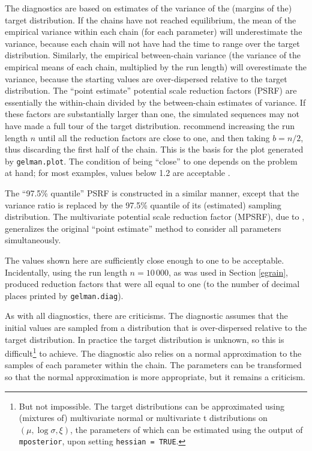\documentclass[11pt,a4paper]{article}
\begin{document}
The diagnostics are based on estimates of the variance of the (margins
of the) target distribution.  If the chains have not reached
equilibrium, the mean of the empirical variance within each chain (for
each parameter) will underestimate the variance, because each chain
will not have had the time to range over the target distribution.
Similarly, the empirical between-chain variance (the variance of the
empirical means of each chain, multiplied by the run length) will
overestimate the variance, because the starting values are
over-dispersed relative to the target distribution.  The ``point
estimate'' potential scale reduction factors (PSRF) are essentially
the within-chain divided by the between-chain estimates of variance.
If these factors are substantially larger than one, the simulated
sequences may not have made a full tour of the target distribution.
\citet{gelmrubi92} recommend increasing the run length $n$ until all
the reduction factors are close to one, and then taking $b=n/2$, thus
discarding the first half of the chain.  This is the basis for the
plot generated by \verb+gelman.plot+.  The condition of being
``close'' to one depends on the problem at hand; for most examples,
values below 1.2 are acceptable \citep{gelmcarl95}.

The ``97.5\% quantile'' PSRF is constructed in a similar manner,
except that the variance ratio is replaced by the 97.5\% quantile of
its (estimated) sampling distribution.  The multivariate potential
scale reduction factor (MPSRF), due to \citet{broogelm97}, generalizes
the original ``point estimate'' method to consider all parameters
simultaneously.

The values shown here are sufficiently close enough to one to be
acceptable.  Incidentally, using the run length $n=10\,000$, as was
used in Section \ref{egrain}, produced reduction factors that were all
equal to one (to the number of decimal places printed by
\verb+gelman.diag+).

As with all diagnostics, there are criticisms.  The diagnostic assumes
that the initial values are sampled from a distribution that is
over-dispersed relative to the target distribution.  In practice the
target distribution is unknown, so this is difficult\footnote{But not
  impossible. The target distributions can be approximated using
  (mixtures of) multivariate normal or multivariate t distributions on
  $(\mu, \log\sigma, \xi)$, the parameters of which can be estimated
  using the output of \texttt{mposterior}, upon setting
  \texttt{hessian = TRUE}.} to achieve.  The diagnostic also relies on
a normal approximation to the samples of each parameter within the
chain.  The parameters can be transformed so that the normal
approximation is more appropriate, but it remains a criticism.
\end{document}
